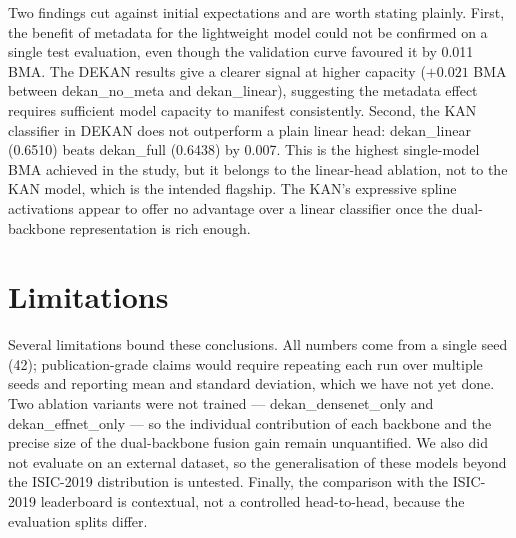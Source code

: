 Two findings cut against initial expectations and are worth stating plainly.
First, the benefit of metadata for the lightweight model could not be confirmed
on a single test evaluation, even though the validation curve favoured it by
0.011 BMA. The DEKAN results give a clearer signal at higher capacity
($+0.021$ BMA between dekan\_no\_meta and dekan\_linear), suggesting the
metadata effect requires sufficient model capacity to manifest consistently.
Second, the KAN classifier in DEKAN does not outperform a plain linear head:
dekan\_linear (0.6510) beats dekan\_full (0.6438) by 0.007. This is the
highest single-model BMA achieved in the study, but it belongs to the
linear-head ablation, not to the KAN model, which is the intended flagship.
The KAN's expressive spline activations appear to offer no advantage over a
linear classifier once the dual-backbone representation is rich enough.

\section{Limitations}

Several limitations bound these conclusions. All numbers come from a single seed
(42); publication-grade claims would require repeating each run over multiple
seeds and reporting mean and standard deviation, which we have not yet done.
Two ablation variants were not trained --- dekan\_densenet\_only and
dekan\_effnet\_only --- so the individual contribution of each backbone and the
precise size of the dual-backbone fusion gain remain unquantified. We also did
not evaluate on an external dataset, so the generalisation of these models beyond
the ISIC-2019 distribution is untested. Finally, the comparison with the
ISIC-2019 leaderboard is contextual, not a controlled head-to-head, because the
evaluation splits differ.
